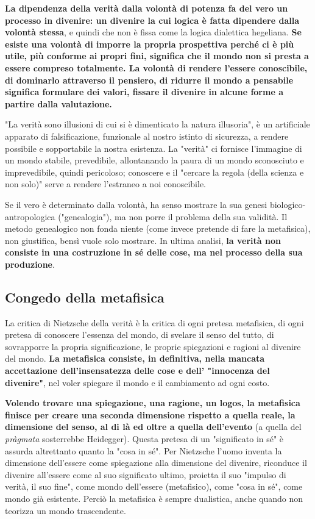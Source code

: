 \textbf{La dipendenza della verità dalla volontà di potenza fa del vero un processo in divenire: un divenire la cui logica è fatta dipendere dalla volontà stessa}, e quindi che non è fissa come la logica dialettica hegeliana. \textbf{Se esiste una volontà di imporre la propria prospettiva perché ci è più utile, più conforme ai propri fini, significa che il mondo non si presta  a essere compreso totalmente. La volontà di rendere l'essere conoscibile, di dominarlo attraverso il pensiero, di ridurre il mondo a pensabile significa formulare dei valori, fissare il divenire in alcune forme a partire dalla valutazione.}

"La verità sono illusioni di cui si è dimenticato la natura illusoria", è un artificiale apparato di falsificazione, funzionale al nostro istinto di sicurezza, a rendere possibile e sopportabile la nostra esistenza. La "verità" ci fornisce l'immagine di un mondo stabile, prevedibile, allontanando la paura di un mondo sconosciuto e imprevedibile, quindi pericoloso; conoscere e il "cercare la regola (della scienza e non solo)" serve a rendere l'estraneo a noi conoscibile.

Se il vero è determinato dalla volontà, ha senso mostrare la sua genesi biologico-antropologica ("genealogia"), ma non porre il problema della sua validità. Il metodo genealogico non fonda niente (come invece pretende di fare la metafisica), non giustifica, bensì vuole solo mostrare. In ultima analisi, \textbf{la verità non consiste in una costruzione in sé delle cose, ma nel processo della sua produzione}.

\subsection{Congedo della metafisica}

La critica di Nietzsche della verità è la critica di ogni pretesa metafisica, di ogni pretesa di conoscere l'essenza del mondo, di svelare il senso del tutto, di sovrapporre la propria significazione, le proprie spiegazioni  e ragioni al divenire del mondo. \textbf{La metafisica consiste, in definitiva, nella mancata accettazione dell'insensatezza delle cose e dell' "innocenza del divenire"}, nel voler spiegare il mondo e il cambiamento ad ogni costo.

\textbf{Volendo trovare una spiegazione, una ragione, un logos, la metafisica finisce per creare una seconda dimensione rispetto a quella reale, la dimensione del senso, al di là ed oltre a quella dell'evento} (a quella del \textit{pràgmata} sosterrebbe Heidegger). Questa pretesa di un "significato in sé" è assurda altrettanto quanto la "cosa in sé". Per Nietzsche l'uomo inventa la dimensione dell'essere come spiegazione alla dimensione del divenire, riconduce il divenire all'essere come al suo significato ultimo, proietta il suo "impulso di verità, il suo fine", come mondo dell'essere (metafisico), come "cosa in sé", come mondo già esistente. Perciò la metafisica è sempre dualistica, anche quando non teorizza un mondo trascendente.

